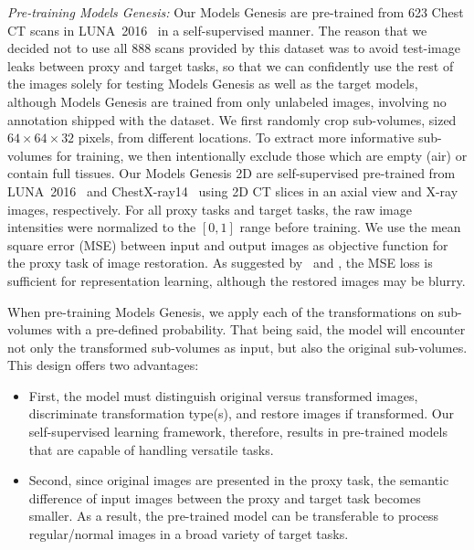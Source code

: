 \textit{Pre-training Models Genesis:} Our Models Genesis are pre-trained from 623 Chest CT scans in LUNA~2016~\citep{setio2017validation} in a self-supervised manner. The reason that we decided not to use all 888 scans provided by this dataset was to avoid test-image leaks between proxy and target tasks, so that we can confidently use the rest of the images solely for testing Models Genesis as well as the target models, although Models Genesis are trained from only unlabeled images, involving no annotation shipped with the dataset. We first randomly crop sub-volumes, sized $64\times 64\times 32$ pixels, from different locations. To extract more informative sub-volumes for training, we then intentionally exclude those which are empty (air) or contain full tissues. Our Models Genesis 2D are self-supervised pre-trained from LUNA~2016~\citep{setio2017validation} and ChestX-ray14~\citep{wang2017chestx} using 2D CT slices in an axial view and X-ray images, respectively. For all proxy tasks and target tasks, the raw image intensities were normalized to the $[0,1]$ range before training. We use the mean square error (MSE) between input and output images as objective function for the proxy task of image restoration. As suggested by~\citet{pathak2016context} and \citet{chen2019self}, the MSE loss is sufficient for representation learning, although the restored images may be blurry.


When pre-training Models Genesis, we apply each of the transformations on sub-volumes with a pre-defined probability. That being said, the model will encounter not only the transformed sub-volumes as input, but also the original sub-volumes. This design offers two advantages:
\begin{itemize}
    \item First, the model must distinguish original versus transformed images, discriminate transformation type(s), and restore images if transformed. Our self-supervised learning framework, therefore, results in pre-trained models that are capable of handling versatile tasks.
    \item Second, since original images are presented in the proxy task, the semantic difference of input images between the proxy and target task becomes smaller. As a result, the pre-trained model can be transferable to process regular/normal images in a broad variety of target tasks.
\end{itemize}


